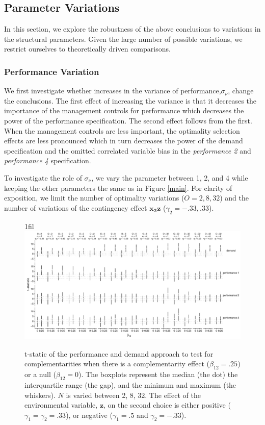 \documentclass[12pt]{article}
\makeatletter
\newcommand*{\centerfloat}{%
  \parindent \z@
  \leftskip \z@ \@plus 1fil \@minus \textwidth
  \rightskip\leftskip
  \parfillskip \z@skip}
\makeatother
\begin{document}
\subsection{Parameter Variations}\label{parameter-variations}

In this section, we explore the robustness of the above conclusions to variations in the structural parameters. Given the large number of possible variations, we restrict ourselves to theoretically driven comparisons.

\subsubsection{Performance Variation}\label{performance-variation}

We first investigate whether increases in the variance of performance,\(\sigma_{\nu}\), change the conclusions. The first effect of increasing the variance is that it decreases the importance of the management controls for performance which decreases the power of the performance specification. The second effect follows from the first. When the management controls are less important, the optimality selection effects are less pronounced which in turn decreases the power of the demand specification and the omitted correlated variable bias in the \emph{performance 2} and \emph{performance 4} specification.

To investigate the role of \(\sigma_{\nu}\), we vary the parameter between 1, 2, and 4 while keeping the other parameters the same as in Figure \ref{main}. For clarity of exposition, we limit the number of optimality variations (\(O = 2, 8, 32\)) and the number of variations of the contingency effect \(\mathbf{x_2 z}\) (\(\gamma_2 = -.33, .33\)).


\begin{figure}
\centerfloat
\includegraphics[width=600px]{figure-latex/noise_plot.pdf}
\caption[Error Rate and Power with Increasing Levels of Variability in Performance]
{\label{noise} t-static of the performance and demand approach to test
for complementarities when there is a complementarity effect ($\beta_{12} = .25$)
or a null ($\beta_{12} = 0$). The boxplots represent the median (the dot) the
interquartile range (the gap), and the minimum and maximum (the whiskers). $N$
is varied between 2, 8, 32. The effect of the environmental
variable, $\mathbf{z}$, on the second choice is either positive
($\gamma_1 = \gamma_2 = .33$), or negative ($\gamma_1 = .5$ and $\gamma_2 = -.33$).}
\end{figure}
\end{document}

